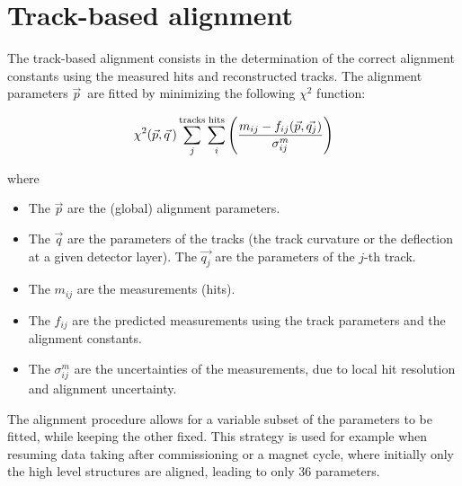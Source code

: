 \section{Track-based alignment}
The track-based alignment consists in the determination of the correct alignment constants using the measured hits and reconstructed tracks.
The alignment parameters $\vec{p}\,$ are fitted by minimizing the following $\chi^2$ function:

\begin{equation}
  \chi^2(\vec{p}, \vec{q}\,) \sum_j^{\rm tracks} \sum_i^{\rm hits} \left( \frac{m_{ij} - f_{ij}(\vec{p}, \vec{q_j})}{\sigma_{ij}^{m}} \right)
\end{equation}

where
\begin{itemize}
  \item The $\vec{p}$ are the (global) alignment parameters.
  \item The $\vec{q}$ are the parameters of the tracks (\eg the track curvature or the deflection at a given detector layer).
    The $\vec{q_j}$ are the parameters of the $j$-th track.
  \item The $m_{ij}$ are the measurements (hits).
  \item The $f_{ij}$ are the predicted measurements using the track parameters and the alignment constants.
  \item The $\sigma^m_{ij}$ are the uncertainties of the measurements, due to local hit resolution and alignment uncertainty.
\end{itemize}

The alignment procedure allows for a variable subset of the parameters to be fitted, while keeping the other fixed.
This strategy is used for example when resuming data taking after commissioning or a magnet cycle, where initially only the high level structures are aligned,
leading to only 36 parameters.

